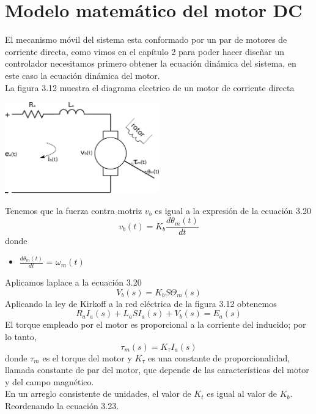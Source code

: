 \section{Modelo matemático del motor DC}
El mecanismo móvil del sistema esta conformado por un par de motores de corriente directa, como vimos
en el capítulo 2 para poder hacer diseñar un controlador necesitamos primero obtener la ecuación dinámica
del sistema, en este caso la ecuación dinámica del motor.\\
La figura 3.12 muestra el diagrama electrico de un motor de corriente directa
\begin{center}
	\includegraphics[width=0.5\textwidth]{Contenido/Cuerpo/Capitulo3/Fig16.eps}
	\label{fig:ModeloMat:Fig1}
\end{center}
Tenemos que la fuerza contra motriz $v_b$ es igual a la expresión de la ecuación 3.20
\begin{equation}
	v_b(t) =K_b \frac{d\theta_m(t)}{dt}
\end{equation}
donde
\begin{itemize}
	\item $ \frac{d\theta_m(t)}{dt} $ = $ \omega_m(t) $
\end{itemize}
Aplicamos laplace a la ecuación 3.20
\begin{equation}
	V_b(s) = K_bS\Theta_m(s)
\end{equation}
Aplicando la ley de Kirkoff a la red eléctrica de la figura 3.12 obtenemos
\begin{equation}
	R_aI_a(s) + L_aSI_a(s) + V_b(s) = E_a(s)
\end{equation}
El torque empleado por el motor es proporcional a la corriente del inducido; por lo tanto,
\begin{equation}
	\tau_m(s) = K_\tau I_a(s)
\end{equation}
donde $\tau_m$ es el torque del motor y $K_\tau$ es una constante de proporcionalidad, llamada constante de par del motor, que depende de las características del motor y del
campo magnético.\\
En un arreglo consistente de unidades, el valor de $K_t$ es igual al valor de $K_b$. Reordenando la ecuación 3.23.
